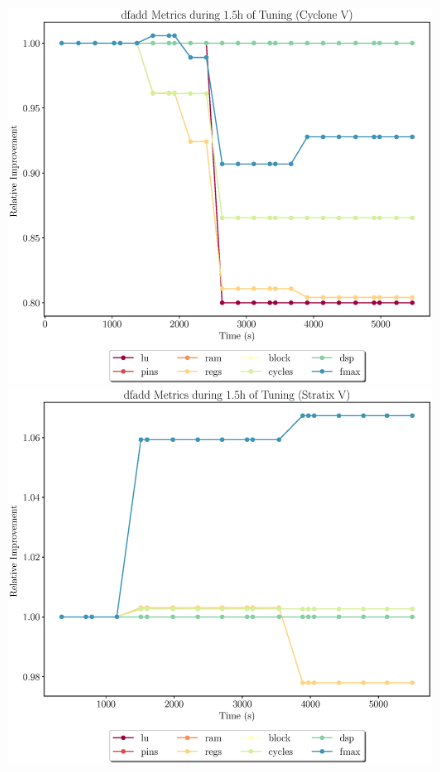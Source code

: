 \documentclass[12pt, a4paper]{article}
\begin{document}
\begin{figure}[htpb]
    \begin{minipage}{.48\textwidth}
        \includegraphics[scale=.29]{dfadd_all_5400_chstone_CycloneV}
    \end{minipage}%
    \hfill
    \begin{minipage}{.48\textwidth}
        \includegraphics[scale=.29]{dfadd_all_5400_chstone_StratixV}
    \end{minipage}%
\end{figure}
\end{document}
